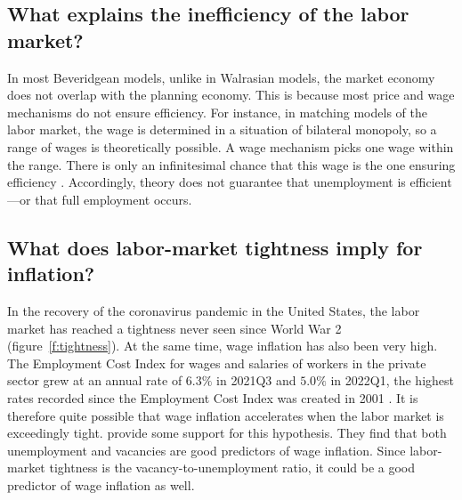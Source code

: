 \documentclass[letterpaper,12pt,leqno]{article}
\newcommand{\bib}{paper.bib}
\begin{document}
\subsection{What explains the inefficiency of the labor market?}

In most Beveridgean models, unlike in Walrasian models, the market economy does not overlap with the planning economy. This is because most price and wage mechanisms do not ensure efficiency. For instance, in matching models of the labor market, the wage is determined in a situation of bilateral monopoly, so a range of wages is theoretically possible. A wage mechanism picks one wage within the range. There is only an infinitesimal chance that this wage is the one ensuring efficiency \citep[p.~185]{P00}. Accordingly, theory does not guarantee that unemployment is efficient---or that full employment occurs.

\subsection{What does labor-market tightness imply for inflation?}

In the recovery of the coronavirus pandemic in the United States, the labor market has reached a tightness never seen since World War 2 (figure~\ref{f:tightness}). At the same time, wage inflation has also been very high. The Employment Cost Index for wages and salaries of workers in the private sector grew at an annual rate of $6.3\%$ in 2021Q3 and $5.0\%$ in 2022Q1, the highest rates recorded since the Employment Cost Index was created in 2001 \citep{ECIWAG}. It is therefore quite possible that wage inflation accelerates when the labor market is exceedingly tight. \citet{DS22} provide some support for this hypothesis. They find that both unemployment and vacancies are good predictors of wage inflation. Since labor-market tightness is the vacancy-to-unemployment ratio, it could be a good predictor of wage inflation as well.


\end{document}
